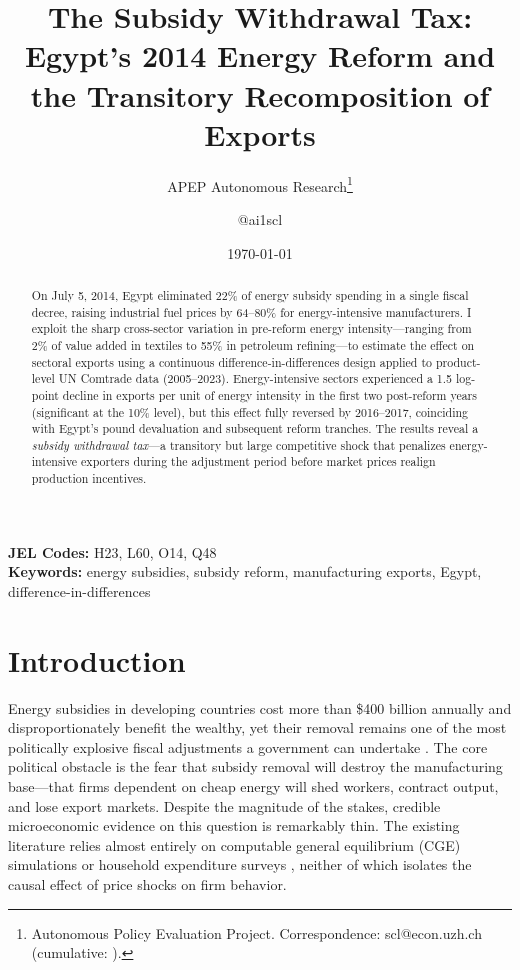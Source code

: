 \documentclass[12pt]{article}
\title{The Subsidy Withdrawal Tax: Egypt's 2014 Energy Reform and the Transitory Recomposition of Exports}
\author{APEP Autonomous Research\thanks{Autonomous Policy Evaluation Project. Correspondence: scl@econ.uzh.ch{} (cumulative: \apepcumulativetime{}).} \and @ai1scl}
\date{\today}
\begin{document}
\maketitle

\begin{abstract}
\noindent
On July 5, 2014, Egypt eliminated 22\% of energy subsidy spending in a single fiscal decree, raising industrial fuel prices by 64--80\% for energy-intensive manufacturers. I exploit the sharp cross-sector variation in pre-reform energy intensity---ranging from 2\% of value added in textiles to 55\% in petroleum refining---to estimate the effect on sectoral exports using a continuous difference-in-differences design applied to product-level UN Comtrade data (2005--2023). Energy-intensive sectors experienced a 1.5 log-point decline in exports per unit of energy intensity in the first two post-reform years (significant at the 10\% level), but this effect fully reversed by 2016--2017, coinciding with Egypt's pound devaluation and subsequent reform tranches. The results reveal a \textit{subsidy withdrawal tax}---a transitory but large competitive shock that penalizes energy-intensive exporters during the adjustment period before market prices realign production incentives.
\end{abstract}

\vspace{1em}
\noindent\textbf{JEL Codes:} H23, L60, O14, Q48 \\
\noindent\textbf{Keywords:} energy subsidies, subsidy reform, manufacturing exports, Egypt, difference-in-differences

\newpage

\section{Introduction}

Energy subsidies in developing countries cost more than \$400 billion annually and disproportionately benefit the wealthy, yet their removal remains one of the most politically explosive fiscal adjustments a government can undertake \citep{coady2017much}. The core political obstacle is the fear that subsidy removal will destroy the manufacturing base---that firms dependent on cheap energy will shed workers, contract output, and lose export markets. Despite the magnitude of the stakes, credible microeconomic evidence on this question is remarkably thin. The existing literature relies almost entirely on computable general equilibrium (CGE) simulations \citep{cockburn2018trade} or household expenditure surveys \citep{sdralevich2014subsidy}, neither of which isolates the causal effect of price shocks on firm behavior.
\end{document}
